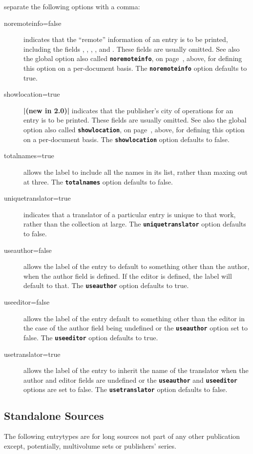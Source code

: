 \documentclass{ltxdockit}
\newcommand*{\mycode}[1]{\texttt{\textbf{#1}}}%
\newenvironment*{optionslistNOT}
  {\list{}{%
     \setlength{\labelwidth}{\marglistwidth}%
     \setlength{\labelsep}{\marglistsep}%
     \setlength{\leftmargin}{50pt}%
     \renewcommand*{\makelabel}[1]{\hss\marglistfont##1}}%
   \def\optionitem##1{%
     \item[{\textbf{##1}}]}}
  {\endlist}
\newcommand*{\newthis}{\textbf{\textcolor{new}{|(new in 2.0)|}} }
\begin{document}
\begin{optionslistNOT}
	\optionitem{options}
	separate the following options with a comma:
	\begin{description}
		\item[noremoteinfo=false] indicates that the ``remote'' information of an entry is to be printed, including the fields , , , , and . These fields are usually omitted. See also the global option also called \mycode{noremoteinfo}, on page~\pageref{mla:internal:noremoteinfo}, above, for defining this option on a per-document basis. The \mycode{noremoteinfo} option defaults to true.
		\item[showlocation=true] \newthis indicates that the publisher's city of operations for an entry is to be printed. These fields are usually omitted. See also the global option also called \mycode{showlocation}, on page~\pageref{mla:internal:showlocation}, above, for defining this option on a per-document basis. The \mycode{showlocation} option defaults to false.
		\item[totalnames=true] allows the label to include all the names in its list, rather than maxing out at three. The \mycode{totalnames} option defaults to false.
		\item[uniquetranslator=true] indicates that a translator of a particular  entry is unique to that work, rather than the collection at large. The \mycode{uniquetranslator} option defaults to false.
		\item[useauthor=false] allows the label of the entry to default to something other than the author, when the author field is defined. If the editor is defined, the label will default to that. The \mycode{useauthor} option defaults to true.
		\item[useeditor=false] allows the label of the entry default to something other than the editor in the case of the author field being undefined or the \mycode{useauthor} option set to false. The \mycode{useeditor} option defaults to true.
		\item[usetranslator=true] allows the label of the entry to inherit the name of the translator when the author and editor fields are undefined or the \mycode{useauthor} and \mycode{useeditor} options are set to false. The \mycode{usetranslator} option defaults to false.
	\end{description}	
\end{optionslistNOT}


\subsection{Standalone Sources}
The following entrytypes are for long sources not part of any other publication except, potentially, multivolume sets or publishers' series.
\end{document}
